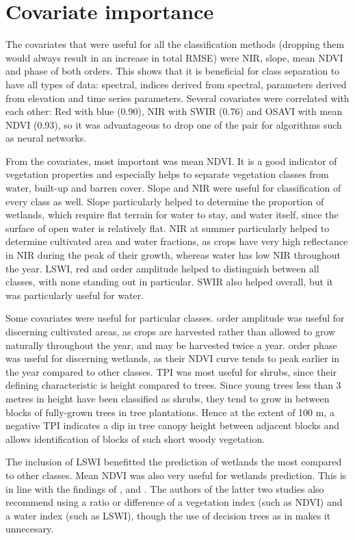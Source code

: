 \documentclass[a4paper,12pt]{scrbook}
\begin{document}
\section{Covariate importance}

The covariates that were useful for all the classification methods (dropping them would always result in an increase in total RMSE) were NIR, slope, mean NDVI and phase of both orders. This shows that it is beneficial for class separation to have all types of data: spectral, indices derived from spectral, parameters derived from elevation and time series parameters. Several covariates were correlated with each other: Red with blue (0.90), NIR with SWIR (0.76) and OSAVI with mean NDVI (0.93), so it was advantageous to drop one of the pair for algorithms such as neural networks.

From the covariates, most important was mean NDVI. It is a good indicator of vegetation properties and especially helps to separate vegetation classes from water, built-up and barren cover. Slope and NIR were useful for classification of every class as well. Slope particularly helped to determine the proportion of wetlands, which require flat terrain for water to stay, and water itself, since the surface of open water is relatively flat. NIR at summer particularly helped to determine cultivated area and water fractions, as crops have very high reflectance in NIR during the peak of their growth, whereas water has low NIR throughout the year. LSWI, red and  order amplitude helped to distinguish between all classes, with none standing out in particular. SWIR also helped overall, but it was particularly useful for water.

Some covariates were useful for particular classes.  order amplitude was useful for discerning cultivated areas, as crops are harvested rather than allowed to grow naturally throughout the year, and may be harvested twice a year.  order phase was useful for discerning wetlands, as their NDVI curve tends to peak earlier in the year compared to other classes. TPI was most useful for shrubs, since their defining characteristic is height compared to trees. Since young trees less than 3 metres in height have been classified as shrubs, they tend to grow in between blocks of fully-grown trees in tree plantations. Hence at the extent of 100 m, a negative TPI indicates a dip in tree canopy height between adjacent blocks and allows identification of blocks of such short woody vegetation.

The inclusion of LSWI benefitted the prediction of wetlands the most compared to other classes. Mean NDVI was also very useful for wetlands prediction. This is in line with the findings of \citet{davranche2010wetland}, \citet{dong2014lswi} and \citet{zhao2009indices}. The authors of the latter two studies also recommend using a ratio or difference of a vegetation index (such as NDVI) and a water index (such as LSWI), though the use of decision trees as in \citet{davranche2010wetland} makes it unnecesary.
\end{document}
